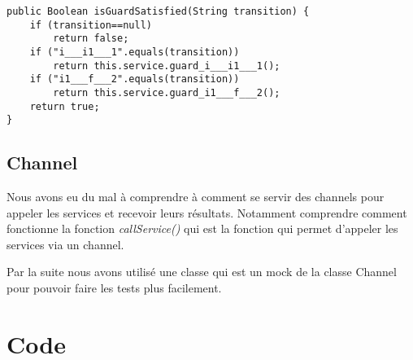 \begin{lstlisting}[frame=single, caption={exemple de fonction généré},label=fig:isGuardSatisfied]
public Boolean isGuardSatisfied(String transition) {
    if (transition==null) 
        return false;
    if ("i___i1___1".equals(transition)) 
        return this.service.guard_i___i1___1();
    if ("i1___f___2".equals(transition)) 
        return this.service.guard_i1___f___2();
    return true;
}
\end{lstlisting}


\subsection*{Channel}
    Nous avons eu du mal à comprendre à comment se servir des channels pour appeler les services et recevoir leurs résultats. Notamment comprendre comment fonctionne la fonction \textit{callService()}  qui est la fonction qui permet d'appeler les services via un channel.
    
    Par la suite nous avons utilisé une classe qui est un mock de la classe Channel pour pouvoir faire les tests plus facilement.

\clearpage

\section{Code}



